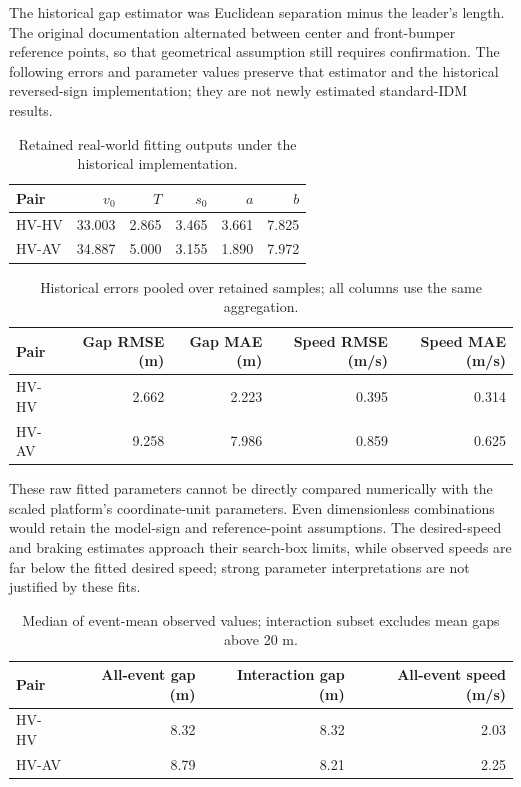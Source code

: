 \documentclass[11pt,a4paper]{article}
\begin{document}
The historical gap estimator was Euclidean separation minus the leader's length. The original documentation alternated between center and front-bumper reference points, so that geometrical assumption still requires confirmation. The following errors and parameter values preserve that estimator and the historical reversed-sign implementation; they are not newly estimated standard-IDM results.


\begin{table}[H]\centering\small
\caption{Retained real-world fitting outputs under the historical implementation.}
\begin{tabular}{lrrrrr}
\toprule
Pair & $v_0$ & $T$ & $s_0$ & $a$ & $b$ \\
\midrule
HV-HV & 33.003 & 2.865 & 3.465 & 3.661 & 7.825 \\
HV-AV & 34.887 & 5.000 & 3.155 & 1.890 & 7.972 \\
\bottomrule\end{tabular}\end{table}

\begin{table}[H]\centering\small
\caption{Historical errors pooled over retained samples; all columns use the same aggregation.}
\begin{tabular}{lrrrr}
\toprule
Pair & Gap RMSE (m) & Gap MAE (m) & Speed RMSE (m/s) & Speed MAE (m/s) \\
\midrule
HV-HV & 2.662 & 2.223 & 0.395 & 0.314 \\
HV-AV & 9.258 & 7.986 & 0.859 & 0.625 \\
\bottomrule\end{tabular}\end{table}

These raw fitted parameters cannot be directly compared numerically with the scaled platform's coordinate-unit parameters. Even dimensionless combinations would retain the model-sign and reference-point assumptions. The desired-speed and braking estimates approach their search-box limits, while observed speeds are far below the fitted desired speed; strong parameter interpretations are not justified by these fits.


\begin{table}[H]\centering\small
\caption{Median of event-mean observed values; interaction subset excludes mean gaps above 20 m.}
\begin{tabular}{lrrr}
\toprule
Pair & All-event gap (m) & Interaction gap (m) & All-event speed (m/s) \\
\midrule
HV-HV & 8.32 & 8.32 & 2.03 \\
HV-AV & 8.79 & 8.21 & 2.25 \\
\bottomrule\end{tabular}\end{table}
\end{document}
